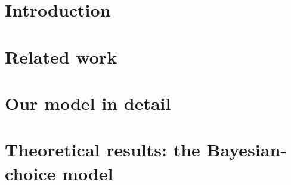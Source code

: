 \documentclass[12pt]{article}
\newcommand{\TheoryModel}{Bayesian-choice model\xspace}
\begin{document}
\newpage
\setcounter{page}{0}

\onehalfspacing
%
%
\section{Introduction}
\label{sec:intro}



\section{Related work}
\label{sec:related-work}


\section{Our model in detail}
\label{sec:model}


\section{Theoretical results: the \TheoryModel}
\label{sec:theory}


%

%

%

%
\end{document}
